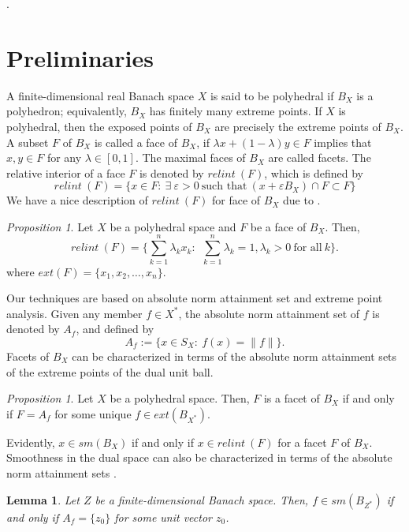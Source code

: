 \documentclass{amsart}
\newtheorem{lemma}[theorem]{Lemma}
\theoremstyle{definition}
\theoremstyle{remark}
\newtheorem{proposition}[theorem]{Proposition}
\numberwithin{equation}{section}
\begin{document}
.

\section{Preliminaries} 

\noindent A finite-dimensional real Banach space $X$ is said to be polyhedral if $B_X$ is a polyhedron; equivalently, $B_X$ has finitely many extreme points. If $X$ is polyhedral, then the exposed points of $B_X$ are precisely the extreme points of $B_X$. A subset $F$ of $B_X$ is called a face of $B_X$, if $\lambda x+(1-\lambda) y\in F$ implies that $x,y\in F$ for any $\lambda\in [0,1]$. The maximal faces of $B_X$ are called facets. The relative interior of a face $F$ is denoted by $relint~(F)$, which is defined by
\[
relint~(F)=\{x\in F:~\exists~ \varepsilon>0~\text{such that}~(x+\varepsilon B_X)\cap F\subset F\}
\]
We have a nice description of $relint~(F)$ for face of $B_X$ due to \cite[Theorem 6.9]{R70}.
\begin{proposition}\label{prop:smooth}
Let $X$ be a polyhedral space and $F$ be a face of $B_X$. Then,
\[
relint~(F)=\{\sum_{k=1}^n \lambda_k x_k:~~\sum_{k=1}^n \lambda_k=1, \lambda_k>0~\text{for all}~k\}.
\]
where $ext(F)=\{x_1,x_2,\dots,x_n\}$.
\end{proposition}

\noindent Our techniques are based on absolute norm attainment set and extreme point analysis. Given any member $f\in X^*$, the absolute norm attainment set of $f$ is denoted by $A_f$, and defined by
\[
A_f:=\{x\in S_X:~f(x)=\|f\|\}.
\]
Facets of $B_X$ can be characterized in terms of the absolute norm attainment sets of the extreme points of the dual unit ball.
\begin{proposition}
Let $X$ be a polyhedral space. Then, $F$ is a facet of $B_X$ if and only if $F=A_f$ for some unique $f\in ext(B_{X^*})$.
\end{proposition}

\noindent Evidently, $x\in sm(B_X)$ if and only if $x\in relint~(F)$ for a facet $F$ of $B_X$. Smoothness in the dual space can also be characterized in terms of the absolute norm attainment sets \cite{R24}.

\begin{lemma}\label{smooth}
Let $Z$ be a finite-dimensional Banach space. Then, $f\in sm(B_{Z^*})$ if and only if $A_f=\{z_0\}$ for some unit vector $z_0$. 
\end{lemma}
\end{document}
